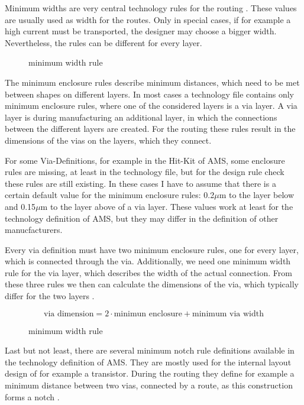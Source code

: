 Minimum widths are very central technology rules for the routing . These values are usually used as width for the routes. Only in special cases, if for example a high current must be transported, the designer may choose a bigger width. Nevertheless, the rules can be different for every layer.

\begin{figure}
	\centering
	
	\caption{minimum width rule}
	\label{fig:technology_rule_width}
\end{figure}

The minimum enclosure rules describe minimum distances, which need to be met between shapes on different layers. In most cases a technology file contains only minimum enclosure rules, where one of the considered layers is a via layer. A via layer is during manufacturing an additional layer, in which the connections between the different layers are created. For the routing these rules result in the dimensions of the vias on the layers, which they connect.

For some Via-Definitions, for example in the Hit-Kit of AMS, some enclosure rules are missing, at least in the technology file, but for the design rule check these rules are still existing. In these cases I have to assume that there is a certain default value for the minimum enclosure rules: 0.2$\mu$m to the layer below and 0.15$\mu$m to the layer above of a via layer. These values work at least for the technology definition of AMS, but they may differ in the definition of other manucfacturers.

Every via definition must have two minimum enclosure rules, one for every layer, which is connected through the via. Additionally, we need one minimum width rule for the via layer, which describes the width of the actual connection. From these three rules we then can calculate the dimensions of the via, which typically differ for the two layers .

\[\text{via dimension} = 2 \cdot \text{minimun enclosure} + \text{minimum via width}\]

\begin{figure}
	\centering
	
	\caption{minimum width rule}
	\label{fig:technology_rule_via_dimensions}
\end{figure}

Last but not least, there are several minimum notch rule definitions available in the technology definition of AMS. They are mostly used for the internal layout design of for example a transistor. During the routing they define for example a minimum distance between two vias, connected by a route, as this construction forms a notch .

